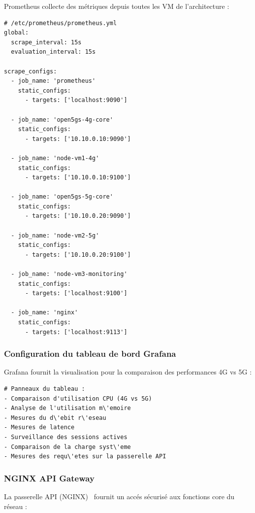 \documentclass[12pt,a4paper]{report}
\begin{document}
Prometheus collecte des métriques depuis toutes les VM de l'architecture :

\begin{lstlisting}[caption=Prometheus Configuration]
# /etc/prometheus/prometheus.yml
global:
  scrape_interval: 15s
  evaluation_interval: 15s

scrape_configs:
  - job_name: 'prometheus'
    static_configs:
      - targets: ['localhost:9090']

  - job_name: 'open5gs-4g-core'
    static_configs:
      - targets: ['10.10.0.10:9090']

  - job_name: 'node-vm1-4g'
    static_configs:
      - targets: ['10.10.0.10:9100']

  - job_name: 'open5gs-5g-core'
    static_configs:
      - targets: ['10.10.0.20:9090']

  - job_name: 'node-vm2-5g'
    static_configs:
      - targets: ['10.10.0.20:9100']

  - job_name: 'node-vm3-monitoring'
    static_configs:
      - targets: ['localhost:9100']

  - job_name: 'nginx'
    static_configs:
      - targets: ['localhost:9113']
\end{lstlisting}

\subsubsection{Configuration du tableau de bord Grafana}

Grafana fournit la visualisation pour la comparaison des performances 4G vs 5G :

\begin{lstlisting}[caption=Structure du tableau de bord Grafana]
# Panneaux du tableau :
- Comparaison d'utilisation CPU (4G vs 5G)
- Analyse de l'utilisation m\'emoire
- Mesures du d\'ebit r\'eseau
- Mesures de latence
- Surveillance des sessions actives
- Comparaison de la charge syst\'eme
- Mesures des requ\'etes sur la passerelle API
\end{lstlisting}

\subsubsection{NGINX API Gateway}

La passerelle API (NGINX)~\cite{nginx-docs} fournit un accés sécurisé aux fonctions core du réseau :
\end{document}
